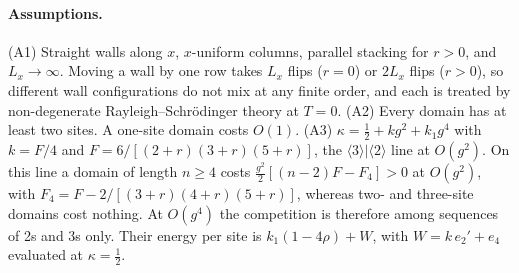 
\paragraph*{Assumptions.}
(A1) Straight walls along $x$, $x$-uniform columns, parallel stacking for $r>0$, and $L_x\to\infty$. Moving a wall
by one row takes $L_x$ flips ($r=0$) or $2L_x$ flips ($r>0$), so different wall configurations do not mix at any
finite order, and each is treated by non-degenerate Rayleigh--Schr\"odinger theory at $T=0$.
(A2) Every domain has at least two sites. A one-site domain costs $O(1)$.
(A3) $\kappa=\tfrac12+kg^2+k_1g^4$ with $k=F/4$ and $F=6/[(2+r)(3+r)(5+r)]$, the $\langle3\rangle|\langle2\rangle$ line at
$O(g^2)$. On this line a domain of length $n\ge4$ costs $\tfrac{g^2}{2}[(n-2)F-F_4]>0$ at $O(g^2)$, with
$F_4=F-2/[(3+r)(4+r)(5+r)]$, whereas two- and three-site domains cost nothing. At $O(g^4)$ the competition is
therefore among sequences of 2s and 3s only. Their energy per site is $k_1(1-4\rho)+W$, with
$W=k\,e_2'+e_4$ evaluated at $\kappa=\tfrac12$.

